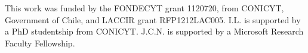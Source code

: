 \label{sec:acknowledgements}
This work was funded by the FONDECYT grant 1120720, from CONICYT, Government of Chile,
and LACCIR grant RFP1212LAC005.
I.L. is supported by a PhD studentship from CONICYT. J.C.N. is supported by a
Microsoft Research Faculty Fellowship.
